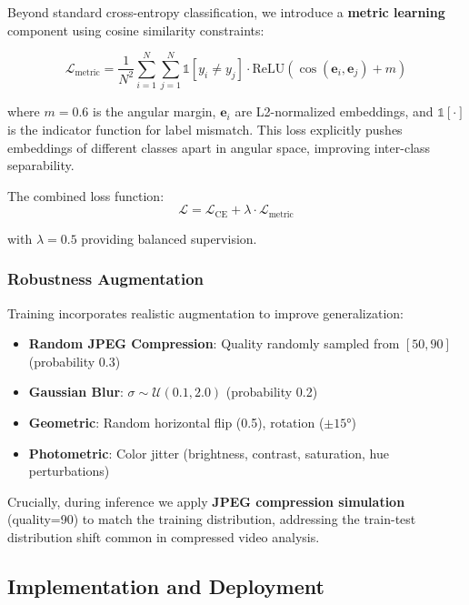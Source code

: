 \documentclass[11pt,a4paper]{article}
\begin{document}
Beyond standard cross-entropy classification, we introduce a \textbf{metric learning} component using cosine similarity constraints:

\begin{equation}
    \mathcal{L}_{\text{metric}} = \frac{1}{N^2} \sum_{i=1}^{N} \sum_{j=1}^{N} \mathbb{1}[y_i \neq y_j] \cdot \text{ReLU}(\cos(\mathbf{e}_i, \mathbf{e}_j) + m)
\end{equation}

where $m = 0.6$ is the angular margin, $\mathbf{e}_i$ are L2-normalized embeddings, and $\mathbb{1}[\cdot]$ is the indicator function for label mismatch. This loss explicitly pushes embeddings of different classes apart in angular space, improving inter-class separability.

The combined loss function:
\begin{equation}
    \mathcal{L} = \mathcal{L}_{\text{CE}} + \lambda \cdot \mathcal{L}_{\text{metric}}
\end{equation}

with $\lambda = 0.5$ providing balanced supervision.

\subsubsection{Robustness Augmentation}

Training incorporates realistic augmentation to improve generalization:

\begin{itemize}
    \item \textbf{Random JPEG Compression}: Quality randomly sampled from $[50, 90]$ (probability 0.3)
    \item \textbf{Gaussian Blur}: $\sigma \sim \mathcal{U}(0.1, 2.0)$ (probability 0.2)
    \item \textbf{Geometric}: Random horizontal flip (0.5), rotation ($\pm 15°$)
    \item \textbf{Photometric}: Color jitter (brightness, contrast, saturation, hue perturbations)
\end{itemize}

Crucially, during inference we apply \textbf{JPEG compression simulation} (quality=90) to match the training distribution, addressing the train-test distribution shift common in compressed video analysis.

\subsection{Implementation and Deployment}
\end{document}
